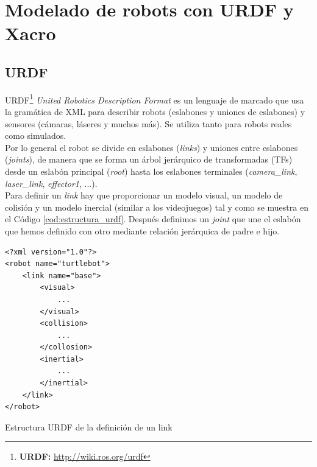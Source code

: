 \section{Modelado de robots con URDF y Xacro}
\label{sec:modelado_urdf_xacro}

\subsection{URDF}
\label{subsec:urdf}

URDF\footnote{\textbf{URDF:} \url{http://wiki.ros.org/urdf}}  \textit{United Robotics Description Format} es un lenguaje de marcado que usa la gramática de XML para describir robots (eslabones y uniones de eslabones) y sensores (cámaras, láseres y muchos más). Se utiliza tanto para robots reales como simulados.\\

Por lo general el robot se divide en eslabones (\textit{links}) y uniones entre eslabones (\textit{joints}), de manera que se forma un árbol jerárquico de transformadas (TFs) desde un eslabón principal (\textit{root}) hasta los eslabones terminales (\textit{camera\_link}, \textit{laser\_link}, \textit{effector1}, ...).\\

Para definir un \textit{link} hay que proporcionar un modelo visual, un modelo de colisión y un modelo inercial (similar a los videojuegos) tal y como se muestra en el Código \ref{cod:estructura_urdf}. Después definimos un \textit{joint} que une el eslabón que hemos definido con otro mediante relación jerárquica de padre e hijo.\\

\begin{code}[H]
\begin{lstlisting}
<?xml version="1.0"?>
<robot name="turtlebot">
	<link name="base">
		<visual>
			...
		</visual>
		<collision>
			...
		</collosion>
		<inertial>
			...
		</inertial>
	</link>
</robot>
\end{lstlisting}
\caption[Estructura URDF de la definicion de un link]{Estructura URDF de la definición de un link}
\label{cod:estructura_urdf}
\end{code}

